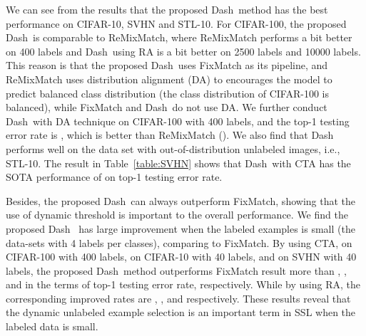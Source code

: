 \documentclass{article}
\def \Alg {Dash}
\begin{document}
We can see from the results that the proposed \Alg~method has the best performance on CIFAR-10, SVHN and STL-10. For CIFAR-100, the proposed \Alg~is comparable to ReMixMatch, where ReMixMatch performs a bit better on 400 labels and \Alg~using RA is a bit better on 2500 labels and 10000 labels. This reason is that the proposed \Alg~uses FixMatch as its pipeline, and ReMixMatch uses distribution alignment (DA) to encourages the model to predict balanced class distribution (the class distribution of CIFAR-100 is balanced), while FixMatch and \Alg~do not use DA. We further conduct 
\Alg~with DA technique on CIFAR-100 with 400 labels, and the top-1 testing error rate is , which is better than ReMixMatch (). We also find that Dash performs well on the data set with out-of-distribution unlabeled images, i.e., STL-10. The result in Table~\ref{table:SVHN} shows that \Alg~with CTA has the SOTA performance of  on top-1 testing error rate.

Besides, the proposed \Alg~can always outperform FixMatch, showing that the use of dynamic threshold is important to the overall performance. We find the proposed \Alg~ has large improvement when the labeled examples is small (the data-sets with 4 labels per classes), comparing to FixMatch. By using CTA, on CIFAR-100 with 400 labels, on CIFAR-10 with 40 labels, and on SVHN with 40 labels, the proposed \Alg~method outperforms FixMatch result more than , , and  in the terms of top-1 testing error rate, respectively. While by using RA, the corresponding improved rates are , , and  respectively. These results reveal that the dynamic unlabeled example selection is an important term in SSL when the labeled data is small. 
\end{document}
